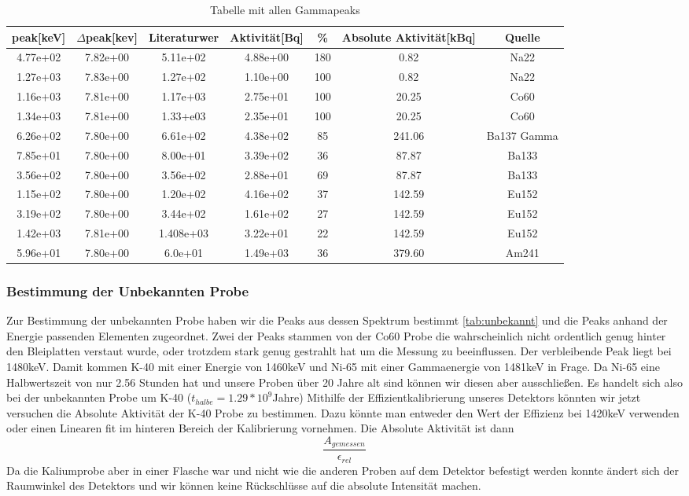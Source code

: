 \documentclass[]{article}
\begin{document}
	\begin{table}[H]
		\centering
		\begin{tabular}{|c|c|c|c|c|c|c|}
			\hline
			peak[keV]&$\Delta$peak[kev]&Literaturwer&Aktivität[Bq]&\%&Absolute Aktivität[kBq]&Quelle \\ \hline\hline
			4.77e+02 & 7.82e+00 & 5.11e+02  & 4.88e+00 &180&0.82& Na22\\ \hline
			1.27e+03 & 7.83e+00 & 1.27e+02& 1.10e+00 &100&0.82& Na22\\ \hline
			1.16e+03 & 7.81e+00 & 1.17e+03 & 2.75e+01 &100&20.25& Co60\\ \hline
			1.34e+03 & 7.81e+00 & 1.33+e03& 2.35e+01 &100&20.25& Co60\\ \hline
			6.26e+02 & 7.80e+00 & 6.61e+02 & 4.38e+02 &85&241.06& Ba137 Gamma\\ \hline
			7.85e+01 & 7.80e+00 & 8.00e+01 & 3.39e+02 &36&87.87& Ba133\\ \hline
			3.56e+02 & 7.80e+00 &3.56e+02 & 2.88e+01 &69&87.87& Ba133\\ \hline
			1.15e+02 & 7.80e+00 & 1.20e+02  & 4.16e+02 &37&142.59&Eu152\\ \hline
			3.19e+02 & 7.80e+00 & 3.44e+02 & 1.61e+02 &27&142.59&Eu152\\ \hline
			1.42e+03 & 7.81e+00 & 1.408e+03  & 3.22e+01 &22&142.59&Eu152\\ \hline
			5.96e+01 & 7.80e+00 &6.0e+01 & 1.49e+03 &36&379.60&Am241\\ \hline
			\hline
		\end{tabular}
		\caption{Tabelle mit allen Gammapeaks\label{}}
	\end{table}
	\subsubsection{Bestimmung der Unbekannten Probe}
	Zur Bestimmung der unbekannten Probe haben wir die Peaks aus dessen Spektrum bestimmt \ref{tab:unbekannt} und die Peaks anhand der Energie passenden Elementen zugeordnet. Zwei der Peaks stammen von der Co60 Probe die wahrscheinlich nicht ordentlich genug hinter den Bleiplatten verstaut wurde, oder trotzdem stark genug gestrahlt hat um die Messung zu beeinflussen. Der verbleibende Peak liegt bei 1480keV. Damit kommen K-40 mit einer Energie von 1460keV und Ni-65 mit einer Gammaenergie von 1481keV in Frage. Da Ni-65 eine Halbwertszeit von nur 2.56 Stunden hat und unsere Proben über 20 Jahre alt sind können wir diesen aber ausschließen. Es handelt sich also bei der unbekannten Probe um K-40 ($t_{halbe}=1.29*10^9$Jahre)
	Mithilfe der Effizientkalibrierung unseres Detektors könnten wir jetzt versuchen die Absolute Aktivität der K-40 Probe zu bestimmen. Dazu könnte man entweder den Wert der Effizienz bei 1420keV verwenden oder einen Linearen fit im hinteren Bereich der Kalibrierung vornehmen.
	Die Absolute Aktivität ist dann
	\begin{equation}
		\frac{A_{gemessen}}{\epsilon_{rel}}
	\end{equation}
	Da die Kaliumprobe aber in einer Flasche war und nicht wie die anderen Proben auf dem Detektor befestigt werden konnte ändert sich der Raumwinkel des Detektors und wir können keine Rückschlüsse auf die absolute Intensität machen.
\end{document}
